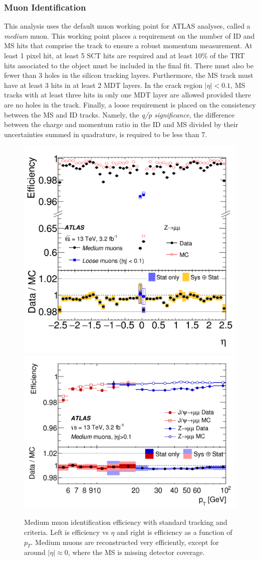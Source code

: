 \subsubsection{Muon Identification}

This analysis uses the default muon working point for ATLAS analyses, called a \emph{medium} muon. This working point places a requirement on the number of \ac{ID} and \ac{MS} hits that comprise the track to ensure a robust momentum measurement. At least 1 pixel hit, at least 5 \ac{SCT} hits are required and at least 10\% of the \ac{TRT} hits associated to the object must be included in the final fit. There must also be fewer than 3 holes in the silicon tracking layers. Furthermore, the \ac{MS} track must have at least 3 hits in at least 2 \ac{MDT} layers. In the crack region $|\eta| < 0.1$, \ac{MS} tracks with at least three hits in only one \ac{MDT} layer are allowed provided there are no holes in the track. Finally, a loose requirement is placed on the consistency between the \ac{MS} and \ac{ID} tracks. Namely, the \emph{q/p significance}, the difference between the charge and momentum ratio in the \ac{ID} and \ac{MS} divided by their uncertainties summed in quadrature, is required to be less than 7. 


\begin{figure}[htbp]
\centering
\includegraphics[width=.43\textwidth]{figures/EventReconstruction/muon-reco-eta.png}
\includegraphics[width=.52\textwidth]{figures/EventReconstruction/muon-reco-pt.png}
\caption{Medium muon identification efficiency with standard tracking and criteria. Left is efficiency vs $\eta$ and right is efficiency as a function of $p_{T}$. Medium muons are reconstructed very efficiently, except for around $|\eta| \approx 0$, where the \ac{MS} is missing detector coverage.}
\label{fig:std_muon_eff}
\end{figure}


